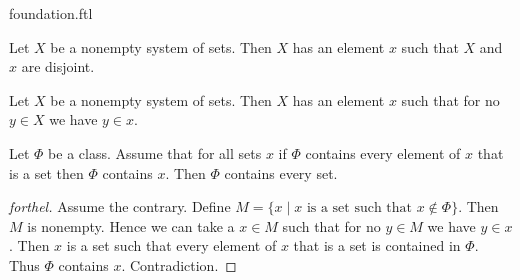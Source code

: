 \documentclass{naproche-library}
\begin{document}
\begin{smodule}[title=The Foundation Axiom]{foundation.ftl}

\begin{axiom}[forthel,title=Foundation,id=FOUNDATIONS_10_1320008569323520]
  Let $X$ be a nonempty system of sets.
  Then $X$ has an element $x$ such that $X$ and $x$ are disjoint.
\end{axiom}

\begin{corollary}[forthel,id=FOUNDATIONS_10_9532145874510315]
  Let $X$ be a nonempty system of sets.
  Then $X$ has an element $x$ such that for no $y \in X$ we have $y \in x$.
\end{corollary}

\begin{proposition}[forthel,id=FOUNDATIONS_11_2812087589928960]
  Let $\Phi$ be a class.
  Assume that for all sets $x$ if $\Phi$ contains every element of $x$ that is a set then $\Phi$ contains $x$.
  Then $\Phi$ contains every set.
\end{proposition}
\begin{proof}[forthel]
  Assume the contrary.
  Define $M = \{ x \mid x\text{ is a set such that }x \notin \Phi \}$.
  Then $M$ is nonempty.
  Hence we can take a $x \in M$ such that for no $y \in M$ we have $y \in x$.
  Then $x$ is a set such that every element of $x$ that is a set is contained in $\Phi$.
  Thus $\Phi$ contains $x$.
  Contradiction.
\end{proof}
\end{smodule}
\end{document}

